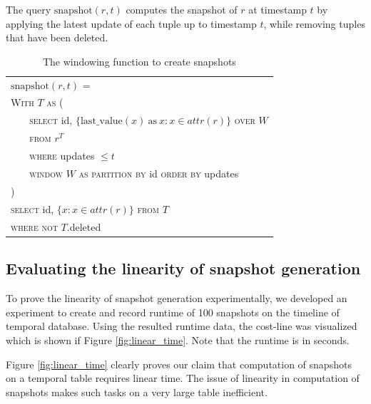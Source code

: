 			The query $\mathrm{snapshot}(r, t)$ computes the snapshot of $r$ at timestamp $t$ by applying the latest update of each tuple up to timestamp $t$, while removing tuples that have been deleted.
			\begin{center}
				\begin{table}[]
					\centering
					\small
						\begin{tabular}{|l|} \hline
							$\mathrm{snapshot}(r, t)$ = \\
							\verb|| \textsc{With} $T$ \textsc{as} ( \\
							\verb|   | \textsc{select} id, $\{\mathrm{last\_value}(x) \mathrm{\ as\ } x:
							x\in attr(r)\}$ \textsc{over} $W$ \\
							\verb|   | \textsc{from} $r^T$ \\
							\verb|   | \textsc{where} updates $\leq t$ \\
							\verb|   | \textsc{window} $W$ \textsc{as} 
							\textsc{partition by} id \textsc{order by} updates\\
							\verb|| ) \\
							\verb|| \textsc{select} id, $\{x: x\in attr(r)\}$ \textsc{from} $T$ \\
							\verb|| \textsc{where not} $T.$deleted \\ \hline
						\end{tabular}
				\caption{The windowing function to create snapshots}
				\label{table:windowing_function}
				\end{table}
			\end{center}

		\subsection{Evaluating the linearity of snapshot generation} \label{sec:evaluating_linearity}
			To prove the linearity of snapshot generation experimentally, we developed an experiment to create and record runtime of 100 snapshots on the timeline of temporal database. Using the resulted runtime data, the cost-line was visualized which is shown if Figure \ref{fig:linear_time}. Note that the runtime is in seconds.

			Figure \ref{fig:linear_time} clearly proves our claim that computation of snapshots on a temporal table requires linear time. The issue of linearity in computation of snapshots makes such tasks on a very large table inefficient.

